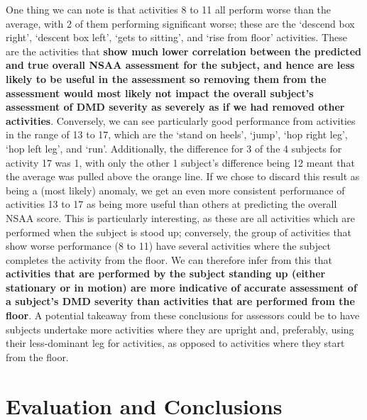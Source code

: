 \documentclass[12pt,twoside]{report}
\begin{document}
\quad One thing we can note is that activities 8 to 11 all perform worse than the average, with 2 of them performing significant worse; these are the ‘descend box right’, ‘descent box left’, ‘gets to sitting’, and ‘rise from floor’ activities. These are the activities that \textbf{show much lower correlation between the predicted and true overall NSAA assessment for the subject, and hence are less likely to be useful in the assessment so removing them from the assessment would most likely not impact the overall subject’s assessment of DMD severity as severely as if we had removed other activities}. Conversely, we can see particularly good performance from activities in the range of 13 to 17, which are the ‘stand on heels’, ‘jump’, ‘hop right leg’, ‘hop left leg’, and ‘run’. Additionally, the difference for 3 of the 4 subjects for activity 17 was 1, with only the other 1 subject’s difference being 12 meant that the average was pulled above the orange line. If we chose to discard this result as being a (most likely) anomaly, we get an even more consistent performance of activities 13 to 17 as being more useful than others at predicting the overall NSAA score. This is particularly interesting, as these are all activities which are performed when the subject is stood up; conversely, the group of activities that show worse performance (8 to 11) have several activities where the subject completes the activity from the floor. We can therefore infer from this that \textbf{activities that are performed by the subject standing up (either stationary or in motion) are more indicative of accurate assessment of a subject’s DMD severity than activities that are performed from the floor}. A potential takeaway from these conclusions for assessors could be to have subjects undertake more activities where they are upright and, preferably, using their less-dominant leg for activities, as opposed to activities where they start from the floor.


























\part{Evaluation and Conclusions}
\end{document}
